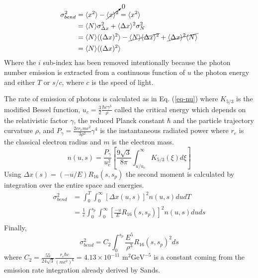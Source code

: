 \begin{align}
\sigma^2_{bend} &= \langle x^2\rangle - \cancelto{0}{\langle x\rangle^2} = \langle x^2 \rangle\label{eq-bsize}\\
 &= \langle N\rangle \sigma^2_{\Delta x} + \langle \Delta x \rangle ^2 \sigma_N^2\\
 &= \langle N\rangle \langle (\Delta x)^2\rangle -\cancel{\langle N\rangle\langle\Delta x\rangle^2} + \cancel{\langle \Delta x \rangle^2\langle N \rangle}\\
 &=\langle N\rangle \langle (\Delta x)^2\rangle
\end{align}
Where the $i$ sub-index has been removed intentionally because the photon number emission is extracted from a continuous function of $u$ the photon energy and either $T$ or $s/c$, where $c$ is the speed of light.\par 
The rate of emission of photons is calculated as in Eq. (\ref{eq-nu}) where $K_{5/3}$ is the modified Bessel function, $u_c=\frac{3}{2}\frac{\hbar c \gamma^3}{\rho}$ called the critical energy which depends on the relativistic factor $\gamma$, the reduced Planck constant $\hbar$ and the particle trajectory curvature $\rho$, and $P_\gamma=\frac{2cr_emc^2}{3\rho^2}\gamma^4$ is the instantaneous radiated power where $r_e$ is the classical electron radius and $m$ is the electron mass.
\begin{equation}
n(u,s)=\frac{P_\gamma}{u_c^2}\left[\frac{9\sqrt{3}}{8\pi}\int_{u/u_c}^\infty K_{5/3}(\xi) d\xi\right]\label{eq-nu}
\end{equation}
Using $\Delta x(s) = (-u/E) R_{16}(s,s_p)$ the second moment is calculated by integration over the entire space and energies.
\begin{align}
 \sigma_{bend}^2&=\int_0^{T} \int_0^\infty [\Delta x(u,s)]^2 n(u,s)dudT\label{eqDeltaX}\\
 &=\frac{1}{c}\int_0^{s_p} \int_0^\infty \left[\frac{-u}{E}R_{16}(s,s_p)\right]^2 n(u,s)duds\\
\end{align}
Finally, 
\begin{equation}
\sigma^2_{bend}=C_2\int_0^{s_p} \frac{E^5}{\rho^3}R_{16}(s,s_p)^2 ds\label{eq-R16}
\end{equation}
where $C_2=\frac{55}{24\sqrt{3}}\frac{r_e\hbar c}{(mc^2)^6}=4.13\times10^{-11} \text{ m}^2\text{GeV}^{-5}$ is a constant coming from the emission rate integration already derived by Sands.\par
